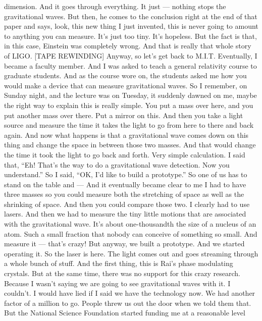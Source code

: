 \begin{itemize}
  dimension. And it goes through everything. It just --- nothing stops
  the gravitational waves. But then, he comes to the conclusion right at
  the end of that paper and says, look, this new thing I just invented,
  this is never going to amount to anything you can measure. It's just
  too tiny. It's hopeless. But the fact is that, in this case, Einstein
  was completely wrong. And that is really that whole story of LIGO.
  {[}TAPE REWINDING{]} Anyway, so let's get back to M.I.T. Eventually, I
  became a faculty member. And I was asked to teach a general relativity
  course to graduate students. And as the course wore on, the students
  asked me how you would make a device that can measure gravitational
  waves. So I remember, on Sunday night, and the lecture was on Tuesday,
  it suddenly dawned on me, maybe the right way to explain this is
  really simple. You put a mass over here, and you put another mass over
  there. Put a mirror on this. And then you take a light source and
  measure the time it takes the light to go from here to there and back
  again. And now what happens is that a gravitational wave comes down on
  this thing and change the space in between those two masses. And that
  would change the time it took the light to go back and forth. Very
  simple calculation. I said that, ``Eh! That's the way to do a
  gravitational wave detection. Now you understand.'' So I said, ``OK,
  I'd like to build a prototype.'' So one of us has to stand on the
  table and --- And it eventually became clear to me I had to have three
  masses so you could measure both the stretching of space as well as
  the shrinking of space. And then you could compare those two. I
  clearly had to use lasers. And then we had to measure the tiny little
  motions that are associated with the gravitational wave. It's about
  one-thousandth the size of a nucleus of an atom. Such a small fraction
  that nobody can conceive of something so small. And measure it ---
  that's crazy! But anyway, we built a prototype. And we started
  operating it. So the laser is here. The light comes out and goes
  streaming through a whole bunch of stuff. And the first thing, this is
  Rai's phase modulating crystals. But at the same time, there was no
  support for this crazy research. Because I wasn't saying we are going
  to see gravitational waves with it. I couldn't. I would have lied if I
  said we have the technology now. We had another factor of a million to
  go. People threw us out the door when we told them that. But the
  National Science Foundation started funding me at a reasonable level

\end{itemize}
